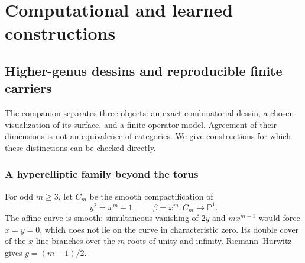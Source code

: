 \documentclass[11pt,oneside,openany]{book}
\theoremstyle{definition}\newtheorem{definition}[theorem]{Definition}
\theoremstyle{remark}\newtheorem{remark}[theorem]{Remark}
\begin{document}
\part{Computational and learned constructions}
\chapter{Higher-genus dessins and reproducible finite carriers}
\label{book:computations}
The companion separates three objects: an exact combinatorial dessin, a chosen visualization of its surface, and a finite operator model. Agreement of their dimensions is not an equivalence of categories. We give constructions for which these distinctions can be checked directly.

\section{A hyperelliptic family beyond the torus}
For odd $m\ge3$, let $C_m$ be the smooth compactification of
\[
 y^2=x^m-1,\qquad \beta=x^m:C_m\longrightarrow\mathbb P^1.
\]
The affine curve is smooth: simultaneous vanishing of $2y$ and $mx^{m-1}$ would force $x=y=0$, which does not lie on the curve in characteristic zero. Its double cover of the $x$-line branches over the $m$ roots of unity and infinity. Riemann--Hurwitz gives $g=(m-1)/2$.
\end{document}
